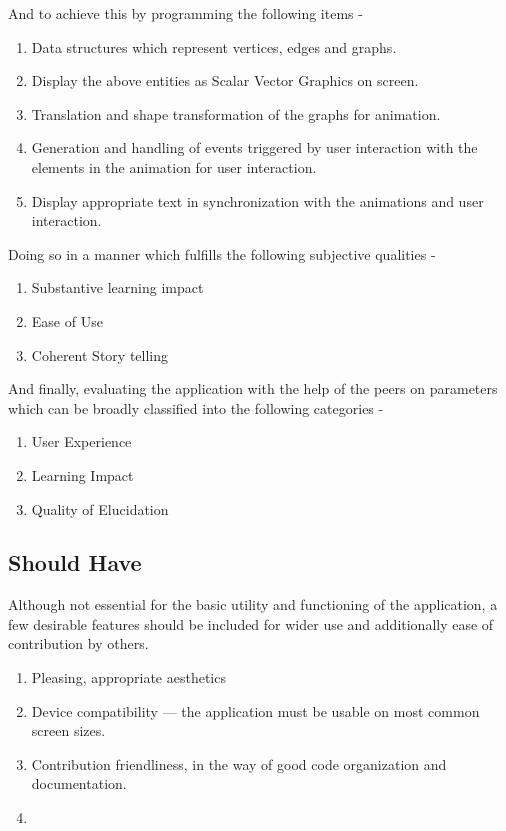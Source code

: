 And to achieve this by programming the following items -

\begin{enumerate}
\item Data structures which represent vertices, edges and graphs.
\item Display the above entities as Scalar Vector Graphics on screen.
\item Translation and shape transformation of the graphs for animation.
\item Generation and handling of events triggered by user interaction with the elements in the animation for user interaction.
\item Display appropriate text in synchronization with the animations and user interaction.
\end{enumerate}

Doing so in a manner which fulfills the following subjective qualities -

\begin{enumerate}
\item Substantive learning impact
\item Ease of Use
\item Coherent Story telling
\end{enumerate}

And finally, evaluating the application with the help of the peers on
parameters which can be broadly classified into the following categories -

\begin{enumerate}
\item User Experience
\item Learning Impact
\item Quality of Elucidation
\end{enumerate}

\subsection{Should Have}
\label{requirements: shouldhave}
Although not essential for the basic utility and functioning of
the application, a few desirable features should be included for wider use and
additionally ease of contribution by others. 
\begin{enumerate}
\item Pleasing, appropriate aesthetics
\item Device compatibility --- the application must be usable on most common screen sizes.
\item Contribution friendliness, in the way of good code organization and documentation.
\item 
\end{enumerate}



